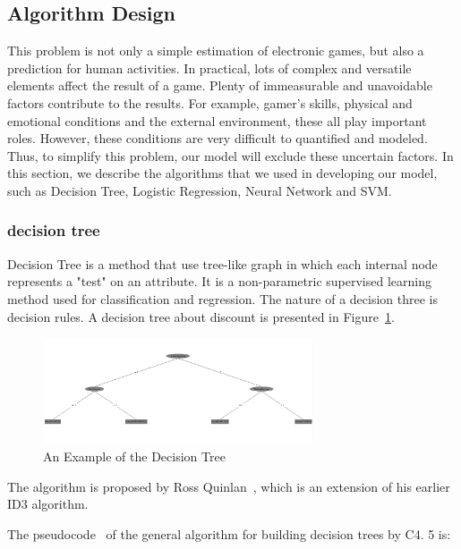 \subsection{Algorithm Design}

This problem is not only a simple estimation of electronic games, but also a prediction for human activities. In practical, lots of complex and versatile elements affect the result of a game. Plenty of immeasurable and unavoidable factors contribute to the results. For example, gamer's skills, physical and emotional conditions and the external environment, these all play important roles. However, these conditions are very difficult to quantified and modeled. Thus, to simplify this problem, our model will exclude these uncertain factors.
In this section, we describe the algorithms that we used in developing our model, such as Decision Tree, Logistic Regression, Neural Network and SVM.
 
\subsubsection{decision tree}
Decision Tree is a method that use tree-like graph in which each internal node represents a "test" on an attribute. It is a non-parametric supervised learning method used for classification and regression. The nature of a decision three is decision rules.
 A decision tree about discount is presented in Figure~\ref{fig:decisiontree}.

\begin{figure}[!htbp]
\centering
\includegraphics[width=8.0cm]{decisiontree.PNG} 
\newline
\caption{An Example of the Decision Tree}
\label{fig:decisiontree} 
\end{figure}


 The algorithm is proposed by Ross Quinlan~\cite{quinlan}, which is an extension of his earlier ID3 algorithm.

The pseudocode~\cite{Kotsiantis} of the general algorithm for building decision trees by C4.
5 is: 

